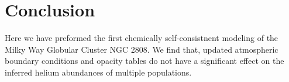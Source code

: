 \section{Conclusion}\label{sec:conclusion}
{\color{red} Here we have preformed the first chemically self-consistnent
modeling of the Milky Way Globular Cluster NGC 2808. We find that, updated
atmospheric boundary conditions and opacity tables do not have a significant
effect on the inferred helium abundances of multiple populations.}
